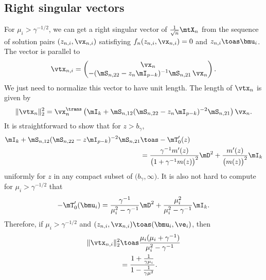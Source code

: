 \subsection{Right singular vectors}

For $\mu_i > \gamma^{-1/2}$, we can get a right singular vector of $\frac{1}{\sqrt{n}} \mtX_n$ from the sequence of solution pairs 
$(z_{n,i}, \vx_{n,i})$ satisfiying 
$f_n(z_{n,i}, \vx_{n,i}) = 0$ and $z_{n,i} \toas \bmu_i$.  The vector
is parallel to
\begin{equation}
    \vtx_{n,i}
    =
    \left(
    \begin{matrix}
        \vx_n \\
        - ( \mS_{n,22} - z_n \mI_{p-k} )^{-1} \mS_{n,21} \, \vx_n
    \end{matrix}
    \right).
\end{equation}
We just need to normalize this vector to have unit length.  The length
of $\vtx_n$ is given by
\begin{equation}
    \| \vtx_n \|_2^2
        =
        \vx_n^\trans
        \left(
            \mI_{k}
            +
            \mS_{n,12}
            ( \mS_{n,22} - z_n \mI_{p-k} )^{-2} 
            \mS_{n,21}
        \right)
        \vx_n.
\end{equation}
It is straightforward to show that for $z > b_\gamma$,
\begin{align*}
    \mI_{k}
    +
    \mS_{n,12}
    ( \mS_{n,22} - z \mI_{p-k} )^{-2} 
    \mS_{n,21}
        &\toas
            -\mT_0'(z) \\
        &= \frac{ \gamma^{-1} m'(z) }
                { \big( 1 + \gamma^{-1} m(z) \big)^2 }
           \mD^2
           +
           \frac{ m'(z) }{ \big( m(z) \big)^2 }
           \mI_k
\end{align*}
uniformly for $z$ in any compact subset of $\big( b_\gamma, \infty \big)$.
It is also not hard to compute for $\mu_i > \gamma^{-1/2}$ that
\[
    -\mT_0'( \bmu_i )
        =
            \frac{ \gamma^{-1} }{ \mu_i^2 - \gamma^{-1} }
            \mD^2
            +
            \frac{ \mu_i^2 }{ \mu_i^2 - \gamma^{-1} }
            \mI_k.
\]
Therefore, if $\mu_i > \gamma^{-1/2}$ and 
$(z_{n,i}, \vx_{n,i}) \toas (\bmu_i, \ve_i)$, then
\begin{align*}
    \| \vtx_{n,i} \|_2^2
        &\toas
            \frac{ \mu_i ( \mu_i + \gamma^{-1} ) }
                 { \mu_i^2 - \gamma^{-1} } \\
        &=
            \frac{ 1 + \tfrac{1}{ \gamma \mu_i} }
                 { 1 - \tfrac{1}{ \gamma \mu^2} }.
\end{align*}

